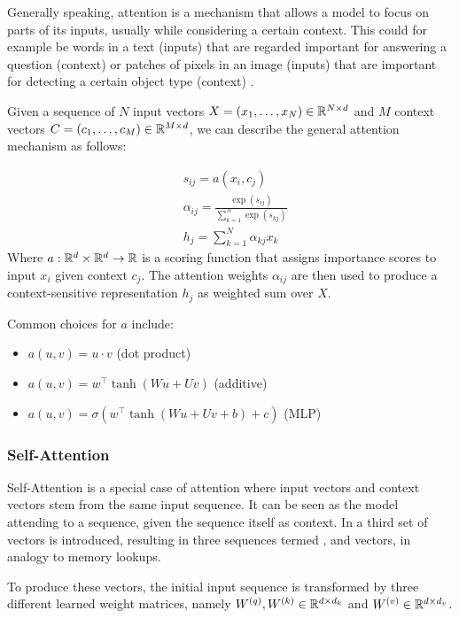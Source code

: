 Generally speaking, attention is a mechanism that allows a model to focus on parts of its inputs, usually while considering a certain context. This could for example be words in a text (inputs) that are regarded important for answering a question (context) \cite{xiong2016dynamic} or patches of pixels in an image (inputs) that are important for detecting a certain object type (context) \cite{xu2015show}.

Given a sequence of $N$ input vectors $X = (x_1, \dots, x_N) \in \mathbb{R}^{N \times d}$ and $M$ context vectors $C = (c_1, \dots, c_M) \in \mathbb{R}^{M \times d}$, we can describe the general attention mechanism as follows:

\begin{align}
     & s_{ij} = a(x_i, c_j)                                         \\
     & \alpha_{ij} = \frac{\exp(s_{ij})}{\sum_{k=1}^N \exp(s_{kj})} \\
     & h_j = \sum_{k=1}^N \alpha_{kj} x_k
\end{align}
Where $a: \mathbb{R}^d \times \mathbb{R}^d \rightarrow \mathbb{R}$ is a scoring function that assigns importance scores to input $x_i$ given context $c_j$. The attention weights $\alpha_{ij}$ are then used to produce a context-sensitive representation $h_j$ as weighted sum over $X$.

Common choices for $a$ include:
\begin{itemize}
    \item $a(u, v) = u \cdot v$ (dot product)
    \item $a(u, v) = w^\top \tanh(W u + U v)$ (additive)
    \item $a(u, v) = \sigma(w^\top \tanh(W u + U v + b) + c)$ (MLP)
\end{itemize}

\subsubsection{Self-Attention}
Self-Attention is a special case of attention where input vectors and context vectors stem from the same input sequence. It can be seen as the model attending to a sequence, given the sequence itself as context. In \cite{vaswani2017attention} a third set of  vectors is introduced, resulting in three sequences termed ,  and  vectors, in analogy to memory lookups.

To produce these vectors, the initial input sequence is transformed by three different learned weight matrices, namely $W^{(q)}, W^{(k)} \in \mathbb{R}^{d \times d_k}$ and $W^{(v)} \in \mathbb{R}^{d \times d_v}$.

